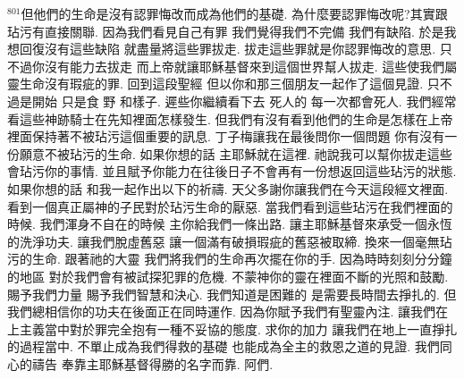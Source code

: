 \documentclass{book}
\begin{document}
$^{801}$但他們的生命是沒有認罪悔改而成為他們的基礎.
為什麼要認罪悔改呢?其實跟玷污有直接關聯.
因為我們看見自己有罪 我們覺得我們不完備 我們有缺陷.
於是我想回復沒有這些缺陷 就盡量將這些罪拔走.
拔走這些罪就是你認罪悔改的意思.
只不過你沒有能力去拔走 而上帝就讓耶穌基督來到這個世界幫人拔走.
這些使我們屬靈生命沒有瑕疵的罪.
回到這段聖經 但以你和那三個朋友一起作了這個見證.
只不過是開始 只是食 野 和樣子.
遲些你繼續看下去 死人的 每一次都會死人.
我們經常看這些神跡騎士在先知裡面怎樣發生.
但我們有沒有看到他們的生命是怎樣在上帝裡面保持著不被玷污這個重要的訊息.
丁子梅讓我在最後問你一個問題 你有沒有一份願意不被玷污的生命.
如果你想的話 主耶穌就在這裡.
祂說我可以幫你拔走這些會玷污你的事情.
並且賦予你能力在往後日子不會再有一份想返回這些玷污的狀態.
如果你想的話 和我一起作出以下的祈禱.
天父多謝你讓我們在今天這段經文裡面.
看到一個真正屬神的子民對於玷污生命的厭惡.
當我們看到這些玷污在我們裡面的時候.
我們渾身不自在的時候 主你給我們一條出路.
讓主耶穌基督來承受一個永恆的洗淨功夫.
讓我們脫虛舊惡 讓一個滿有破損瑕疵的舊惡被取締.
換來一個毫無玷污的生命.
跟著祂的大靈 我們將我們的生命再次擺在你的手.
因為時時刻刻分分鐘的地區 對於我們會有被試探犯罪的危機.
不蒙神你的靈在裡面不斷的光照和鼓勵.
賜予我們力量 賜予我們智慧和決心.
我們知道是困難的 是需要長時間去掙扎的.
但我們總相信你的功夫在後面正在同時運作.
因為你賦予我們有聖靈內注.
讓我們在上主義當中對於罪完全抱有一種不妥協的態度.
求你的加力 讓我們在地上一直掙扎的過程當中.
不單止成為我們得救的基礎 也能成為全主的救恩之道的見證.
我們同心的禱告 奉靠主耶穌基督得勝的名字而靠.
阿們.
\newpage
\end{document}
